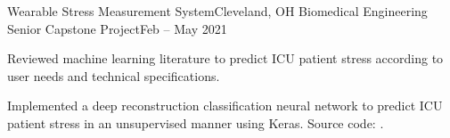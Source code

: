 \begin{ritemize}
{Wearable Stress Measurement System}{Cleveland, OH}
{Biomedical Engineering Senior Capstone Project}{Feb -- May 2021}
	\item Reviewed machine learning literature to predict ICU patient stress according to user needs and technical specifications.
	\item Implemented a deep reconstruction classification neural network to predict ICU patient stress in an unsupervised manner using Keras. Source code: .
\end{ritemize}